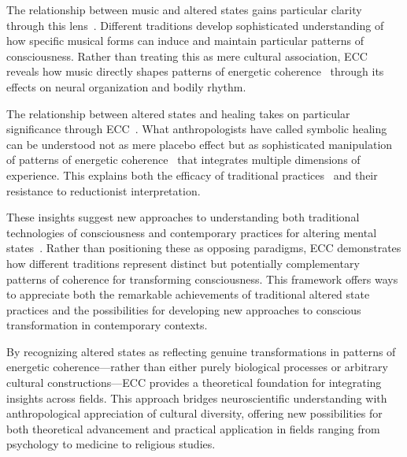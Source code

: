 The relationship between music and altered states gains particular clarity through this lens~\cite{rouget1985music,collins2004interaction}. Different traditions develop sophisticated understanding of how specific musical forms can induce and maintain particular patterns of consciousness. Rather than treating this as mere cultural association, ECC reveals how music directly shapes patterns of energetic coherence~ through its effects on neural organization and bodily rhythm.

The relationship between altered states and healing takes on particular significance through ECC~\cite{csordas2002body,csordas1994sacred}. What anthropologists have called symbolic healing~ can be understood not as mere placebo effect but as sophisticated manipulation of patterns of energetic coherence~ that integrates multiple dimensions of experience. This explains both the efficacy of traditional practices~ and their resistance to reductionist interpretation.

These insights suggest new approaches to understanding both traditional technologies of consciousness and contemporary practices for altering mental states~\cite{winkelman2010shamanism,bloch1989ritual}. Rather than positioning these as opposing paradigms, ECC demonstrates how different traditions represent distinct but potentially complementary patterns of coherence for transforming consciousness. This framework offers ways to appreciate both the remarkable achievements of traditional altered state practices and the possibilities for developing new approaches to conscious transformation in contemporary contexts.

By recognizing altered states as reflecting genuine transformations in patterns of energetic coherence—rather than either purely biological processes or arbitrary cultural constructions—ECC provides a theoretical foundation for integrating insights across fields. This approach bridges neuroscientific understanding with anthropological appreciation of cultural diversity, offering new possibilities for both theoretical advancement and practical application in fields ranging from psychology to medicine to religious studies.


